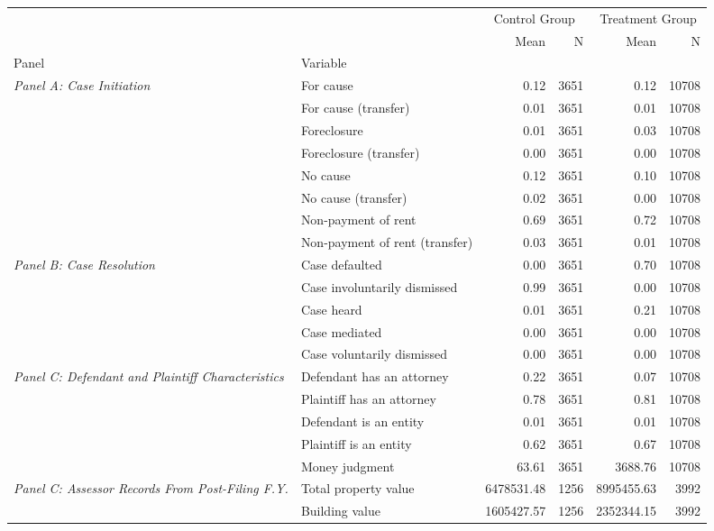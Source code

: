 \begin{table}[H]
\begin{tabular}{llrrrr}
\toprule
 &  & \multicolumn{2}{c}{Control Group} & \multicolumn{2}{c}{Treatment Group} \\
 &  & Mean & N & Mean & N \\
Panel & Variable &  &  &  &  \\
\midrule
\multirow[c]{8}{4cm}{\textit{Panel A: Case Initiation}} & For cause & 0.12 & 3651 & 0.12 & 10708 \\
 & For cause (transfer) & 0.01 & 3651 & 0.01 & 10708 \\
 & Foreclosure & 0.01 & 3651 & 0.03 & 10708 \\
 & Foreclosure (transfer) & 0.00 & 3651 & 0.00 & 10708 \\
 & No cause & 0.12 & 3651 & 0.10 & 10708 \\
 & No cause (transfer) & 0.02 & 3651 & 0.00 & 10708 \\
 & Non-payment of rent & 0.69 & 3651 & 0.72 & 10708 \\
 & Non-payment of rent (transfer) & 0.03 & 3651 & 0.01 & 10708 \\
\cline{1-6}
\multirow[c]{5}{4cm}{\textit{Panel B: Case Resolution}} & Case defaulted & 0.00 & 3651 & 0.70 & 10708 \\
 & Case involuntarily dismissed & 0.99 & 3651 & 0.00 & 10708 \\
 & Case heard & 0.01 & 3651 & 0.21 & 10708 \\
 & Case mediated & 0.00 & 3651 & 0.00 & 10708 \\
 & Case voluntarily dismissed & 0.00 & 3651 & 0.00 & 10708 \\
\cline{1-6}
\multirow[c]{5}{4cm}{\textit{Panel C: Defendant and Plaintiff Characteristics}} & Defendant has an attorney & 0.22 & 3651 & 0.07 & 10708 \\
 & Plaintiff has an attorney & 0.78 & 3651 & 0.81 & 10708 \\
 & Defendant is an entity & 0.01 & 3651 & 0.01 & 10708 \\
 & Plaintiff is an entity & 0.62 & 3651 & 0.67 & 10708 \\
 & Money judgment & 63.61 & 3651 & 3688.76 & 10708 \\
\cline{1-6}
\multirow[c]{5}{4cm}{\textit{Panel C: Assessor Records From Post-Filing F.Y.}} & Total property value & 6478531.48 & 1256 & 8995455.63 & 3992 \\
 & Building value & 1605427.57 & 1256 & 2352344.15 & 3992 \\

\end{tabular}
\end{table}
